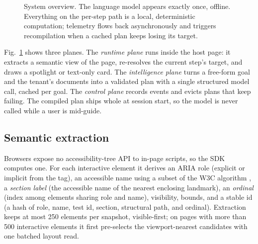 \documentclass[conference]{IEEEtran}
\begin{document}
\begin{figure}[!t]
\caption{System overview. The language model appears exactly once, offline. Everything on the per-step path is a local, deterministic computation; telemetry flows back asynchronously and triggers recompilation when a cached plan keeps losing its target.}
\label{fig:arch}
\end{figure}

Fig.~\ref{fig:arch} shows three planes. The \emph{runtime plane} runs inside the host page: it extracts a semantic view of the page, re-resolves the current step's target, and draws a spotlight or text-only card. The \emph{intelligence plane} turns a free-form goal and the tenant's documents into a validated plan with a single structured model call, cached per goal. The \emph{control plane} records events and evicts plans that keep failing. The compiled plan ships whole at session start, so the model is never called while a user is mid-guide.

\subsection{Semantic extraction}
Browsers expose no accessibility-tree API to in-page scripts, so the SDK computes one. For each interactive element it derives an ARIA role (explicit or implicit from the tag), an accessible name using a subset of the W3C algorithm \cite{w3c_accname}, a \emph{section label} (the accessible name of the nearest enclosing landmark), an \emph{ordinal} (index among elements sharing role and name), visibility, bounds, and a stable id (a hash of role, name, test id, section, structural path, and ordinal). Extraction keeps at most 250 elements per snapshot, visible-first; on pages with more than 500 interactive elements it first pre-selects the viewport-nearest candidates with one batched layout read.
\end{document}
